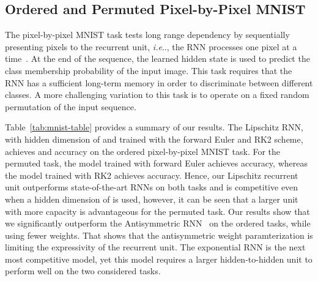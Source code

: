 \documentclass{article} \usepackage{iclr2021_conference,times}
\makeatletter
\DeclareRobustCommand\onedot{\futurelet\@let@token\@onedot}
\def\@onedot{\ifx\@let@token.\else.\null\fi\xspace}
\def\ie{\emph{i.e}\onedot} \def\Ie{\emph{I.e}\onedot}
\makeatother
\begin{document}
\subsection{Ordered and Permuted Pixel-by-Pixel MNIST}\label{sec:mnist}

The pixel-by-pixel MNIST task tests long range dependency by
sequentially presenting  pixels to the recurrent unit, \ie, the RNN processes one pixel at a time~\citep{le2015simple}. 
At the end of the sequence, the learned hidden state is used to predict the class membership probability of the input image. This task requires that the RNN has a sufficient long-term memory in order to discriminate between different classes. A more challenging variation to this task is to operate on a fixed random permutation of the input sequence.


Table~\ref{tab:mnist-table} provides a summary of our results.
The Lipschitz RNN, with hidden dimension of  and trained with the forward Euler and RK2 scheme, achieves  and  accuracy on the ordered pixel-by-pixel MNIST task. 
For the permuted task, the model trained with forward Euler achieves  accuracy, whereas the model trained with RK2 achieves  accuracy.
Hence, our Lipschitz recurrent unit outperforms state-of-the-art RNNs on both tasks and is competitive even when a hidden dimension of  is used, however, it can be seen that a larger unit with more capacity is advantageous for the permuted task.
Our results show that we significantly outperform the Antisymmetric RNN~\citep{chang2018antisymmetricrnn} on the ordered tasks, while using fewer weights. That shows that the antisymmetric weight paramterization is limiting the expressivity of the recurrent unit.
The exponential RNN is the next most competitive model, yet this model requires a larger hidden-to-hidden unit to perform well on the two considered tasks. 
\end{document}

